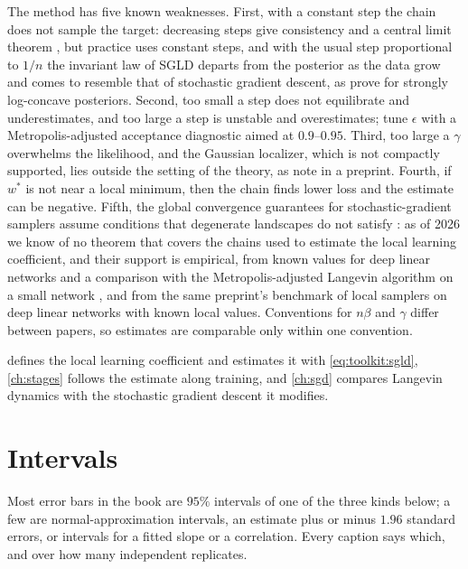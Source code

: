 \begin{refsection}
The method has five known weaknesses. First, with a constant step the chain does not sample the target: decreasing steps give consistency and a central limit theorem \parencite{TehEtAl2016}, but practice uses constant steps, and with the usual step proportional to $1/n$ the invariant law of SGLD departs from the posterior as the data grow and comes to resemble that of stochastic gradient descent, as \textcite{BrosseEtAl2018} prove for strongly log-concave posteriors. Second, too small a step does not equilibrate and underestimates, and too large a step is unstable and overestimates; \textcite[Appendix~H]{LauEtAl2025} tune $\epsilon$ with a Metropolis-adjusted acceptance diagnostic aimed at $0.9$--$0.95$. Third, too large a $\gamma$ overwhelms the likelihood, and the Gaussian localizer, which is not compactly supported, lies outside the setting of the theory, as \textcite{HitchcockHoogland2025} note in a preprint. Fourth, if $w^*$ is not near a local minimum, then the chain finds lower loss and the estimate can be negative. Fifth, the global convergence guarantees for stochastic-gradient samplers assume conditions that degenerate landscapes do not satisfy \parencite{HitchcockHoogland2025}: as of 2026 we know of no theorem that covers the chains used to estimate the local learning coefficient, and their support is empirical, from known values for deep linear networks and a comparison with the Metropolis-adjusted Langevin algorithm on a small network \parencite{LauEtAl2025}, and from the same preprint's benchmark of local samplers on deep linear networks with known local values. Conventions for $n\beta$ and $\gamma$ differ between papers, so estimates are comparable only within one convention.

 defines the local learning coefficient and estimates it with \eqref{eq:toolkit:sgld}, \cref{ch:stages} follows the estimate along training, and \cref{ch:sgd} compares Langevin dynamics with the stochastic gradient descent it modifies.

\section{Intervals}\label{sec:toolkit:intervals}

Most error bars in the book are $95\%$ intervals of one of the three kinds below; a few are normal-approximation intervals, an estimate plus or minus $1.96$ standard errors, or intervals for a fitted slope or a correlation. Every caption says which, and over how many independent replicates.


\end{refsection}
